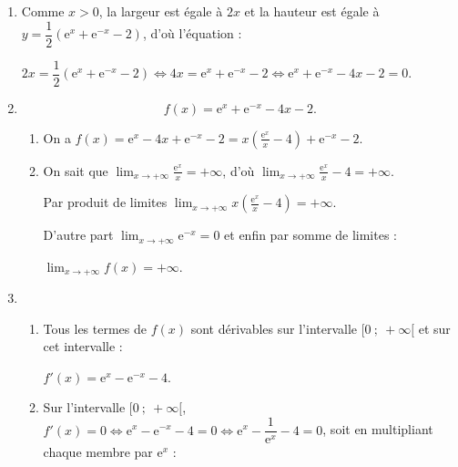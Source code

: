 \documentclass[10pt]{article}
\begin{document}
\medskip

\begin{enumerate}
\item %

Comme $x > 0$, la largeur est égale à $2x$ et la hauteur est égale à $y = \dfrac{1}{2}\left(\text{e}^x + \text{e}^{-x} - 2\right)$, d'où l'équation :

$2x = \dfrac{1}{2}\left(\text{e}^x + \text{e}^{-x} - 2\right) \iff 4x = \text{e}^x + \text{e}^{-x} - 2 \iff \text{e}^x + \text{e}^{- x} - 4x - 2 = 0$.
\item  %

\[f(x) = \text{e}^x + \text{e}^{- x} - 4x - 2.\]

	\begin{enumerate}
		\item %
		On a $f(x) =  \text{e}^x - 4x + \text{e}^{- x} - 2 = x \left(\frac{\text{e}^x}{x} - 4 \right) + \text{e}^{- x} - 2$.
		\item %
		On sait que $\displaystyle\lim_{x \to + \infty} \frac{\text{e}^x}{x} = + \infty$, d'où $\displaystyle\lim_{x \to + \infty} \frac{\text{e}^x}{x} - 4 = + \infty$.

Par produit de limites $\displaystyle\lim_{x \to + \infty} x \left(\frac{\text{e}^x}{x} - 4 \right) = + \infty$.

D'autre part $\displaystyle\lim_{x \to + \infty}\text{e}^{-x} = 0$ et enfin par somme de limites :

$\displaystyle\lim_{x \to + \infty} f(x) = + \infty$.
	\end{enumerate}
\item  
	\begin{enumerate}
		\item %
Tous les termes de $f(x)$ sont dérivables sur l'intervalle $[0~;~ +\infty[$ et sur cet intervalle :

$f'(x) =  \text{e}^x - \text{e}^{- x} - 4$.
		\item %
Sur l'intervalle $[0~;~ +\infty[$,\:$f'(x) = 0 \iff \text{e}^x - \text{e}^{- x} - 4  = 0 \iff \text{e}^x - \dfrac{1}{\text{e}^{x}} - 4  = 0$, soit en multipliant chaque membre par $\text{e}^x$ :


\end{enumerate}
\end{enumerate}
\end{document}
